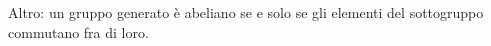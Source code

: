 \documentclass[a4paper]{article}
\begin{document}





Altro: un gruppo generato è abeliano se e solo se gli elementi del
sottogruppo commutano fra di loro.



%
%
%
%
%
%
%
%
%
\end{document}
